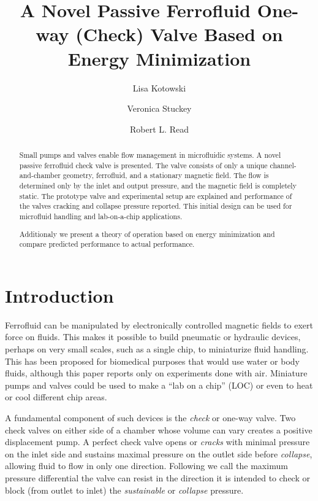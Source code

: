 \documentclass[]{asme2ej}
\title{A Novel Passive Ferrofluid One-way (Check) Valve Based on Energy Minimization}
\author{Lisa Kotowski

}
\author{Veronica Stuckey
  \affiliation{
    Biomedical Engineer, University of Texas at Austin \\
    Email:  stuckey002@gmail.com
    }
}
\author{Robert L. Read
\affiliation{
  Founder, Public Invention\\
  Email: read.robert@gmail.com
    }
}
\begin{document}
\maketitle

\begin{abstract}

Small pumps and valves enable flow management in microfluidic systems.
A novel passive ferrofluid check valve is presented.
The valve consists of only a
unique channel-and-chamber geometry, ferrofluid, and a stationary
magnetic field.
The flow is determined only by the inlet and output pressure,
and the magnetic field is completely static.
The prototype valve and experimental setup are explained
and performance of the valves cracking and collapse pressure reported.
This initial design can be used for microfluid handling and lab-on-a-chip
applications.

Additionaly we present a theory of operation based on energy minimization
and compare predicted performance to actual performance.
\end{abstract}

\section{Introduction}

Ferrofluid can be manipulated by electronically controlled magnetic
fields to exert force on fluids\cite{torres2014recent,kole2021engineering,ozbey2015modeling}.
This makes it possible to build pneumatic or hydraulic
devices, perhaps on very small scales,
such as a single chip\cite{yamahata2003ferrofluid,hatch2001ferrofluidic}, to
miniaturize fluid handling.
This has been proposed for biomedical purposes\cite{michelson2019novel}
that would use water or body fluids,
although this paper reports only on experiments done with air.
Miniature pumps and valves could be used to make a “lab on a chip” (LOC) or
even to heat or cool different chip areas.

A fundamental component of such
devices is the {\em check} or one-way valve.
Two check
valves on either side of a chamber whose volume can vary creates a
positive displacement pump.
A perfect check valve opens or
{\em cracks} with minimal pressure on the inlet side and sustains maximal
pressure on the outlet side before {\em collapse},
allowing fluid to flow in only one
direction. Following\cite{hartshorne2004ferrofluid} we call the maximum pressure
differential the valve can resist in the direction it is intended to
check or block (from outlet to inlet) the {\em sustainable} or {\em collapse} pressure.
\end{document}
